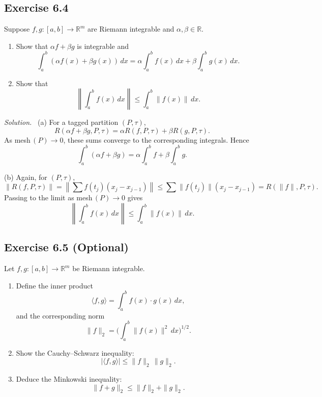 \documentclass[11pt,a4paper]{article}
\newenvironment{solution}{\par\noindent\textit{Solution.}\ }{\par\vspace{0.5em}}
\begin{document}
\subsection*{Exercise 6.4}
Suppose $f,g:[a,b]\to\mathbb{R}^m$ are Riemann integrable and $\alpha,\beta\in\mathbb{R}$.

\begin{enumerate}[label=\alph*)]
	\item Show that $\alpha f+\beta g$ is integrable and
	\[
	\int_a^b (\alpha f(x)+\beta g(x))\,dx 
	= \alpha \int_a^b f(x)\,dx + \beta \int_a^b g(x)\,dx.
	\]
	
	\item Show that
	\[
	\left\|\int_a^b f(x)\,dx\right\| \leq \int_a^b \|f(x)\|\,dx.
	\]
\end{enumerate}

\begin{solution}
	(a) For a tagged partition $(P,\tau)$,
	\[
	R(\alpha f+\beta g,P,\tau)=\alpha R(f,P,\tau)+\beta R(g,P,\tau).
	\]
	As mesh$\,(P)\to 0$, these sums converge to the corresponding integrals. Hence
	\[
	\int_a^b (\alpha f+\beta g)=\alpha\int_a^b f + \beta\int_a^b g.
	\]
	
	(b) Again, for $(P,\tau)$,
	\[
	\left\|R(f,P,\tau)\right\|
	=\left\|\sum f(t_j)(x_j-x_{j-1})\right\|
	\leq \sum \|f(t_j)\|(x_j-x_{j-1})
	=R(\|f\|,P,\tau).
	\]
	Passing to the limit as mesh$\,(P)\to 0$ gives
	\[
	\left\|\int_a^b f(x)\,dx\right\| \leq \int_a^b \|f(x)\|\,dx.
	\]
\end{solution}


\subsection*{Exercise 6.5 (Optional)}
Let $f,g:[a,b]\to\mathbb{R}^m$ be Riemann integrable.

\begin{enumerate}[label=\alph*)]
	\item Define the inner product
	\[
	\langle f,g\rangle = \int_a^b f(x)\cdot g(x)\,dx,
	\]
	and the corresponding norm
	\[
	\|f\|_2 = \Big(\int_a^b \|f(x)\|^2\,dx\Big)^{1/2}.
	\]
	
	\item Show the Cauchy--Schwarz inequality:
	\[
	|\langle f,g\rangle| \leq \|f\|_2 \,\|g\|_2.
	\]
	
	\item Deduce the Minkowski inequality:
	\[
	\|f+g\|_2 \leq \|f\|_2+\|g\|_2.
	\]
\end{enumerate}
\end{document}
